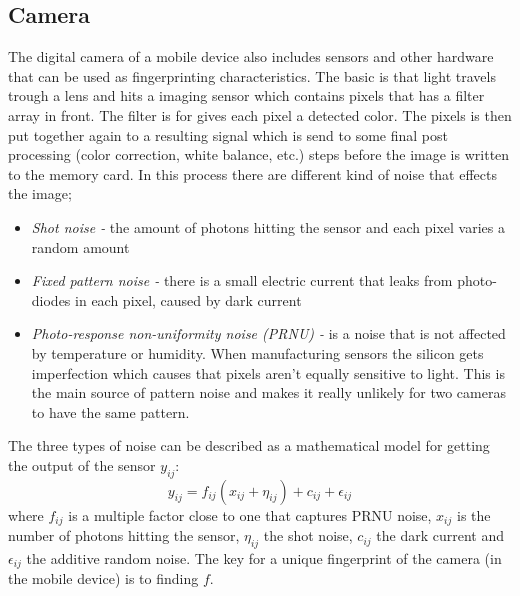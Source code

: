 \subsection{Camera}\label{sec:char:camera}
The digital camera of a mobile device also includes sensors and other hardware that can be used as fingerprinting characteristics. The basic is that light travels trough a lens and hits a imaging sensor which contains pixels that has a filter array in front. The filter is for gives each pixel a detected color. The pixels is then put together again to a resulting signal which is send to some final post processing (color correction, white balance, etc.) steps before the image is written to the memory card. In this process there are different kind of noise that effects the image;
\begin{itemize}
	\item[] \textit{Shot noise -} the amount of photons hitting the sensor and each pixel varies a random amount
	\item[] \textit{Fixed pattern noise - }there is a small electric current that leaks from photo-diodes in each pixel, caused by dark current
	\item[] \textit{Photo-response non-uniformity noise (PRNU) -} is a noise that is not affected by temperature or humidity. When manufacturing sensors the silicon gets imperfection which causes that pixels aren't equally sensitive to light. This is the main source of pattern noise and makes it really unlikely for two cameras to have the same pattern.
\end{itemize}
The three types of noise can be described as a mathematical model for getting the output of the sensor $y_{ij}$:
$$y_{ij}=f_{ij}(x_{ij}+\eta_{ij})+c_{ij}+\epsilon_{ij}$$
where $f_{ij}$ is a multiple factor close to one that captures PRNU noise, $x_{ij}$ is the number of photons hitting the sensor, $\eta_{ij}$ the shot noise, $c_{ij}$ the dark current and $\epsilon_{ij}$ the additive random noise. The key for a unique fingerprint of the camera (in the mobile device) is to finding $f$.
\cite{sensor:camera:DCIdent}


